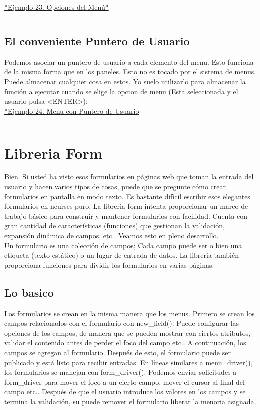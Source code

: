 \documentclass{article}
\begin{document}
\href{https://github.com/nasciiboy/NCURSES-Programming-HOWTO/blob/master/ncurses_programs/menus/menu_attrib.c}{*Ejemplo 23. Opciones del Menú*}
\inputminted{cpp}{./cpp/023_opciones_menu.cpp}

\subsection{El conveniente Puntero de Usuario}%
Podemos asociar un puntero de usuario a cada elemento del menu. Esto funciona
de la misma forma que en los paneles. Esto no es tocado por el sistema de
menus. Puede almacenar cualquier cosa en estos. Yo suelo utilizarlo para
almacenar la función a ejecutar cuando se elige la opcion de menu (Esta
seleccionada y el usuario pulsa <ENTER>);\\

\href{https://github.com/nasciiboy/NCURSES-Programming-HOWTO/blob/master/ncurses_programs/menus/menu_userptr.c}{*Ejemplo 24. Menu con Puntero de Usuario} 
\inputminted{cpp}{./cpp/024_puntero_usuario_menu.cpp}

\section{Libreria Form}%
Bien. Si usted ha visto esos formularios en páginas web que toman la entrada
del usuario y hacen varios tipos de cosas, puede que se pregunte cómo crear
formularios en pantalla en modo texto. Es bastante difícil escribir esos
elegantes formularios en ncurses puro. La libreria form intenta proporcionar un
marco de trabajo básico para construir y mantener formularios con facilidad.
Cuenta con gran cantidad de características (funciones) que gestionan la
validación, expansión dinámica de campos, etc.. Veamos esto en pleno
desarrollo.\\

Un formulario es una colección de campos; Cada campo puede ser o bien una
etiqueta (texto estático) o un lugar de entrada de datos. La libreria también
proporciona funciones para dividir los formularios en varias páginas.

\subsection{Lo basico}%
Los formularios se crean en la misma manera que los menus. Primero se crean los
campos relacionados con el formulario con new\_field(). Puede configurar las
opciones de los campos, de manera que se pueden mostrar con ciertos atributos,
validar el contenido antes de perder el foco del campo etc.. A continuación,
los campos se agregan al formulario. Después de esto, el formulario puede ser
publicado y está listo para recibir entradas. En líneas similares a
menu\_driver(), los formularios se manejan con form\_driver(). Podemos enviar
solicitudes a form\_driver para mover el foco a un cierto campo, mover el cursor
al final del campo etc.. Después de que el usuario introduce los valores en los
campos y se termina la validación, su puede remover el formulario liberar la
menoria asignada.\\
\end{document}
